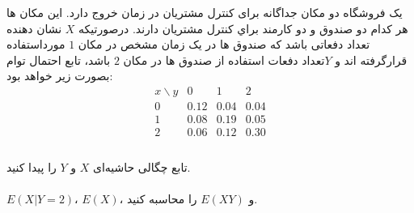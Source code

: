 \problem{}
یک فروشگاه دو مكان جداگانه برای كنترل مشتريان در زمان خروج دارد. اين مكان ها 
هر كدام
 دو صندوق
  و دو كارمند
    براي كنترل مشتريان
    دارند. درصورتيكه 
    $X$ نشان دهنده تعداد دفعاتی 
 باشد كه صندوق ها در يک زمان مشخص در 
مكان $1$
مورداستفاده قرارگرفته اند و $Y$تعداد
دفعات استفاده از صندوق ها در مكان $2$ باشد، تابع احتمال توام بصورت زير خواهد بود:\\
\[
\begin{array}{c|ccc}
x \backslash y & 0 & 1 & 2 \\
\hline
0 & 0.12 & 0.04 & 0.04 \\
1 & 0.08 & 0.19 & 0.05 \\
2 & 0.06 & 0.12 & 0.30 \\
\end{array}
\]
\\
\subproblem{}
تابع چگالی حاشیه‌ای $X$ و $Y$ را پیدا کنید.\\
\\
\subproblem{}
$E(X|Y=2)$، $E(X)$، و $E(XY)$ را محاسبه کنید.\\
